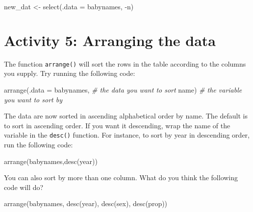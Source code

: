 \documentclass[
  oneside]{book}
\newenvironment{Shaded}{\begin{snugshade}}{\end{snugshade}}
\newcommand{\AttributeTok}[1]{\textcolor[rgb]{0.77,0.63,0.00}{#1}}
\newcommand{\CommentTok}[1]{\textcolor[rgb]{0.56,0.35,0.01}{\textit{#1}}}
\newcommand{\FunctionTok}[1]{\textcolor[rgb]{0.00,0.00,0.00}{#1}}
\newcommand{\NormalTok}[1]{#1}
\newcommand{\OtherTok}[1]{\textcolor[rgb]{0.56,0.35,0.01}{#1}}
\newcommand{\SpecialCharTok}[1]{\textcolor[rgb]{0.00,0.00,0.00}{#1}}
\begin{document}
\begin{Shaded}
\begin{Highlighting}[]
\NormalTok{new\_dat }\OtherTok{\textless{}{-}} \FunctionTok{select}\NormalTok{(}\AttributeTok{.data =}\NormalTok{ babynames, }\SpecialCharTok{{-}}\NormalTok{n)}
\end{Highlighting}
\end{Shaded}

\hypertarget{activity-5-arranging-the-data}{%
\section{Activity 5: Arranging the data}\label{activity-5-arranging-the-data}}

The function \texttt{arrange()} will sort the rows in the table according to the columns you supply. Try running the following code:

\begin{Shaded}
\begin{Highlighting}[]
\FunctionTok{arrange}\NormalTok{(}\AttributeTok{.data =}\NormalTok{ babynames, }\CommentTok{\# the data you want to sort}
\NormalTok{        name) }\CommentTok{\# the variable you want to sort by}
\end{Highlighting}
\end{Shaded}

The data are now sorted in ascending alphabetical order by name. The default is to sort in ascending order. If you want it descending, wrap the name of the variable in the \texttt{desc()} function. For instance, to sort by year in descending order, run the following code:

\begin{Shaded}
\begin{Highlighting}[]
\FunctionTok{arrange}\NormalTok{(babynames,}\FunctionTok{desc}\NormalTok{(year)) }
\end{Highlighting}
\end{Shaded}

You can also sort by more than one column. What do you think the following code will do?

\begin{Shaded}
\begin{Highlighting}[]
\FunctionTok{arrange}\NormalTok{(babynames, }\FunctionTok{desc}\NormalTok{(year), }\FunctionTok{desc}\NormalTok{(sex), }\FunctionTok{desc}\NormalTok{(prop)) }
\end{Highlighting}
\end{Shaded}
\end{document}
